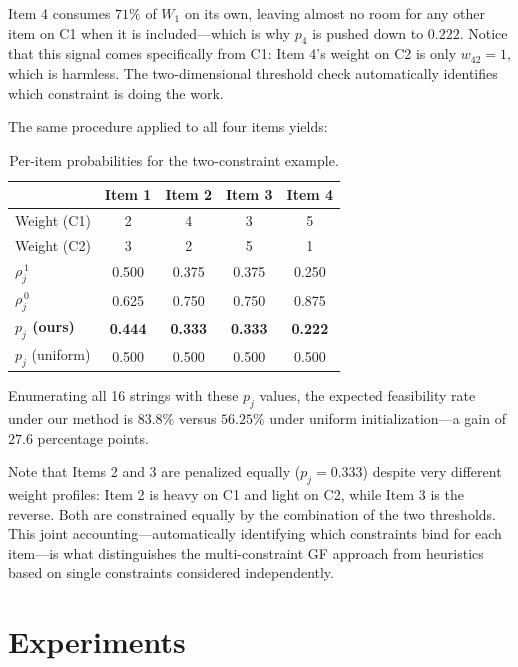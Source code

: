\documentclass[twocolumn]{article}
\begin{document}
\noindent Item 4 consumes $71\%$ of $W_1$ on its own, leaving almost no 
room for any other item on C1 when it is included---which is why $p_4$ 
is pushed down to $0.222$. Notice that this signal comes specifically 
from C1: Item 4's weight on C2 is only $w_{42} = 1$, which is harmless. 
The two-dimensional threshold check automatically identifies which 
constraint is doing the work.

The same procedure applied to all four items yields:

\begin{table}[H]
\centering
\begin{tabular}{lcccc}
\toprule
 & Item 1 & Item 2 & Item 3 & Item 4 \\
\midrule
Weight (C1)           & 2     & 4     & 3     & 5     \\
Weight (C2)           & 3     & 2     & 5     & 1     \\
$\rho_{j}^{\,1}$      & 0.500 & 0.375 & 0.375 & 0.250 \\
$\rho_{j}^{\,0}$      & 0.625 & 0.750 & 0.750 & 0.875 \\
\textbf{$p_j$ (ours)} & \textbf{0.444} & \textbf{0.333} & \textbf{0.333} & \textbf{0.222} \\
$p_j$ (uniform)       & 0.500 & 0.500 & 0.500 & 0.500 \\
\bottomrule
\end{tabular}
\caption{Per-item probabilities for the two-constraint example.}
\label{tab:multiconstrain}
\end{table}

\noindent Enumerating all 16 strings with these $p_j$ values, the 
expected feasibility rate under our method is $\mathbf{83.8\%}$ versus 
$56.25\%$ under uniform initialization---a gain of $27.6$ percentage 
points.

Note that Items 2 and 3 are penalized equally ($p_j = 0.333$) despite 
very different weight profiles: Item 2 is heavy on C1 and light on C2, 
while Item 3 is the reverse. Both are constrained equally by the 
combination of the two thresholds. This joint accounting---automatically 
identifying which constraints bind for each item---is what distinguishes 
the multi-constraint GF approach from heuristics based on single 
constraints considered independently.

\section{Experiments}
\label{sec:experiments}
\end{document}
